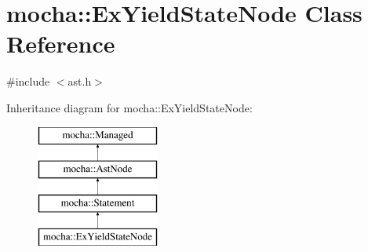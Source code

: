 \hypertarget{classmocha_1_1_ex_yield_state_node}{
\section{mocha::ExYieldStateNode Class Reference}
\label{classmocha_1_1_ex_yield_state_node}
}


{\ttfamily \#include $<$ast.h$>$}

Inheritance diagram for mocha::ExYieldStateNode:\begin{figure}[H]
\begin{center}
\leavevmode
\includegraphics[height=4.000000cm]{classmocha_1_1_ex_yield_state_node}
\end{center}
\end{figure}
